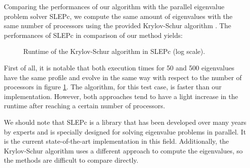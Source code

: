 Comparing the performances of our algorithm with the parallel eigenvalue problem solver SLEPc, we compute the same amount of eigenvalues with the same number of processors using the provided Krylov-Schur algorithm \cite{stewart_krylovschur_2002}.
The performances of SLEPc in comparison of our method yields:

\begin{figure}[H]
 \centering
 
 \caption{Runtime of the Krylov-Schur algorithm in SLEPc (log scale).}
 \label{fig:slepc}
\end{figure}

First of all, it is notable that both execution times for 50 and 500 eigenvalues have the same profile and evolve in the same way with respect to the number of processors in figure \ref{fig:slepc}.
The algorithm, for this test case, is faster than our implementation.
However, both approaches tend to have a light increase in the runtime after reaching a certain number of processors.

We should note that SLEPc is a library that has been developed over many years by experts and is specially designed for solving eigenvalue problems in parallel.
It is the current state-of-the-art implementation in this field.
Additionally, the Krylov-Schur algorithm uses a different approach to compute the eigenvalues, so the methods are difficult to compare directly.
